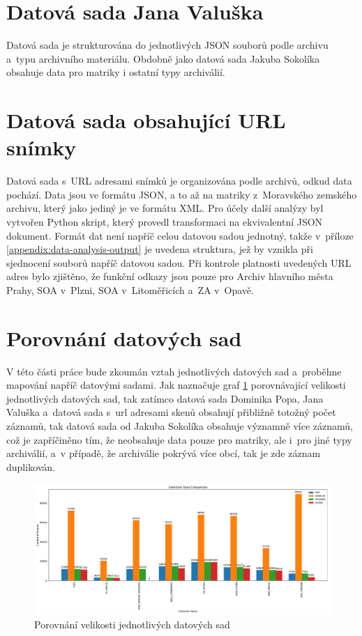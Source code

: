 \section{Datová sada Jana Valuška}
Datová sada \cite{Valusek} je strukturována do jednotlivých JSON souborů podle archivu a~typu archivního materiálu. Obdobně jako datová sada Jakuba Sokolíka obsahuje data pro matriky i ostatní typy archiválií.

\section{Datová sada obsahující URL snímky}
Datová sada s~URL adresami snímků je organizována podle archivů, odkud data pochází. Data jsou ve formátu JSON, a to až na matriky z~Moravského zemského archivu, který jako jediný je ve formátu XML. Pro účely další analýzy byl vytvořen Python skript, který provedl transformaci na ekvivalentní JSON dokument. Formát dat není napříč celou datovou sadou jednotný, takže v~příloze \ref{appendix:data-analysis-output} je uvedena struktura, jež by vznikla při sjednocení souborů napříč datovou sadou. Při kontrole platnosti uvedených URL adres bylo zjištěno, že funkční odkazy jsou pouze pro Archiv hlavního města Prahy, SOA v~Plzni, SOA v~Litoměřicích a~ZA v~Opavě.

\section{Porovnání datových sad}
V této části práce bude zkoumán vztah jednotlivých datových sad a~proběhne mapování napříč datovými sadami.
\newpara
Jak naznačuje graf \ref{fig:datasets-comparison} porovnávající velikosti jednotlivých datových sad, tak zatímco datová sada Dominika Popa, Jana Valuška a~datová sada s~url adresami skenů obsahují přibližně totožný počet záznamů, tak datová sada od Jakuba Sokolíka obsahuje významně více záznamů, což je zapříčiněno tím, že neobsahuje data pouze pro matriky, ale i~pro jiné typy archiválií, a~v případě, že archiválie pokrývá více obcí, tak je zde záznam duplikován.

\begin{figure}[htbp]
\centering
    \includegraphics[scale=.3]{obrazky-figures/dataAnalysis/collectionSizesComparison.pdf}
    \caption{Porovnání velikosti jednotlivých datových sad}
    \label{fig:datasets-comparison}
\end{figure}


